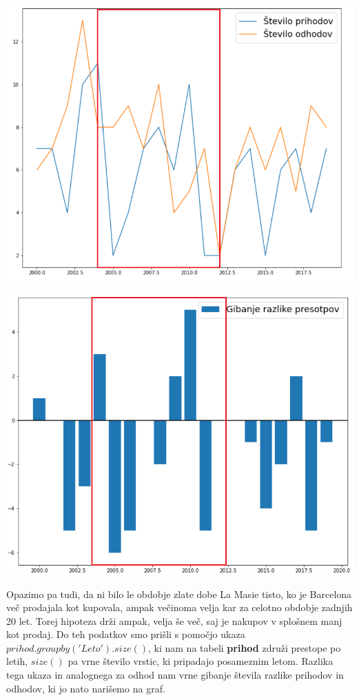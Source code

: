 \documentclass[a4paper, 12pt]{article}
\begin{document}
\begin{minipage}{0.49\textwidth}
\includegraphics[width=1\textwidth]{graf2}
\label{fig:graf2}
\end{minipage}
\begin{minipage}{0.49\textwidth}
\includegraphics[width=1\textwidth]{graf3}
\label{fig:graf3}
\end{minipage} \medskip

Opazimo pa tudi, da ni bilo le obdobje zlate dobe La Masie tisto, ko je Barcelona več prodajala kot kupovala, ampak večinoma velja kar za celotno obdobje zadnjih 20 let. Torej hipoteza drži ampak, velja še več, saj je nakupov v splošnem manj kot prodaj.
Do teh podatkov smo prišli s pomočjo ukaza $prihod.groupby('Leto').size()$, ki nam na tabeli \textbf{prihod} združi prestope po letih, $size()$ pa vrne število vrstic, ki pripadajo posameznim letom. 
Razlika tega ukaza in analognega za odhod nam vrne gibanje števila razlike prihodov in odhodov, ki jo nato narišemo na graf. \medskip
\end{document}
